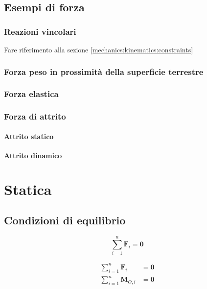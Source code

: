 \section{Esempi di forza}
\subsection{Reazioni vincolari}
{\color{red} Fare riferimento alla sezione \ref{mechanics:kinematics:constraints}}

\subsection{Forza peso in prossimità della superficie terrestre}
\subsection{Forza elastica}
\subsection{Forza di attrito}
\subsubsection{Attrito statico}
\subsubsection{Attrito dinamico}



\chapter{Statica}

\section{Condizioni di equilibrio}
\begin{definition}
    \begin{equation}
        \sum_{i=1}^{n} \mathbf{F}_i = \mathbf{0}
    \end{equation}
\end{definition}

\begin{definition}
    \begin{equation}
    \begin{aligned}
        \sum_{i=1}^{n} \mathbf{F}_i & = \mathbf{0} \\
        \sum_{i=1}^{n} \mathbf{M}_{O,i} & = \mathbf{0}
    \end{aligned}
    \end{equation}
\end{definition}

